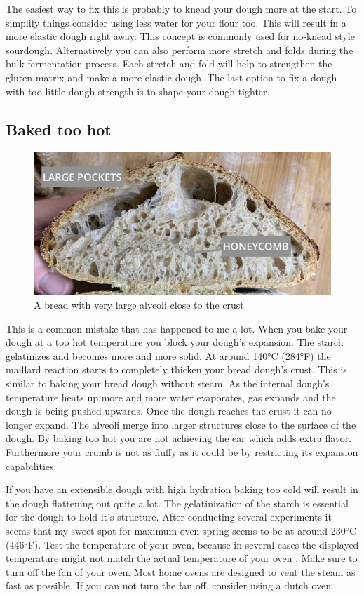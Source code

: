 The easiest way to fix this is probably to knead your dough more at the start. To simplify
things consider using less water for your flour too. This will result in a more elastic dough
right away. This concept is commonly used for no-knead style sourdough.  Alternatively you
can also perform more stretch and folds during the bulk fermentation process. Each
stretch and fold will help to strengthen the gluten matrix and make a more elastic dough.
The last option to fix a dough with too little dough strength is to shape your dough tighter.

\subsection{Baked too hot}

\begin{figure}
  \includegraphics[width=\textwidth]{baked-too-hot-v2}
  \caption{A bread with very large alveoli close to the crust}
  \label{baked-too-hot}
\end{figure}

This is a common mistake that has happened to me a lot. When you bake your dough
at a too hot temperature you block your dough's expansion. The starch gelatinizes
and becomes more and more solid. At around 140°C (284°F) the maillard reaction
starts to completely thicken your bread dough's crust. This is similar to baking
your bread dough without steam. As the internal dough's temperature heats up
more and more water evaporates, gas expands and the dough is being pushed upwards.
Once the dough reaches the crust it can no longer expand. The alveoli merge
into larger structures close to the surface of the dough. By baking too hot
you are not achieving the ear which adds extra flavor. Furthermore your crumb
is not as fluffy as it could be by restricting its expansion capabilities.

If you have an extensible dough with high hydration baking too cold will result
in the dough flattening out quite a lot. The gelatinization of the starch is
essential for the dough to hold it's structure. After conducting several
experiments it seems that my sweet spot for maximum oven spring seems to be
at around 230°C (446°F). Test the temperature of your oven, because in several
cases the displayed temperature might not match the actual temperature of your
oven \cite{too+hot+baking}. Make sure to turn off the fan of your oven. Most
home ovens are designed to vent the steam as fast as possible. If you can not
turn the fan off, consider using a dutch oven.

